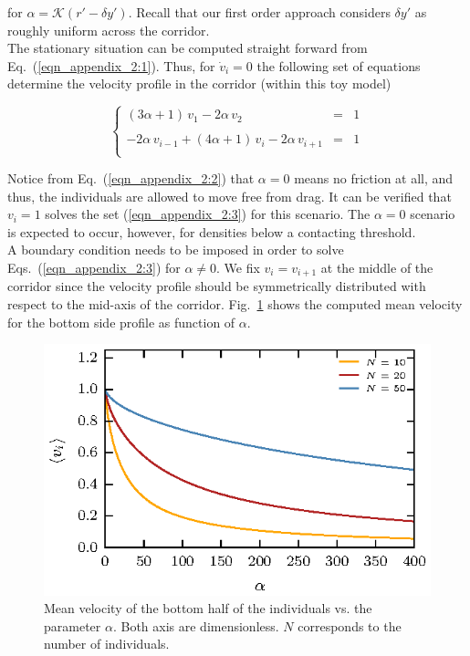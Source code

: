 \documentclass[preprint,12pt]{elsarticle}
\begin{document}
\noindent for $\alpha=\mathcal{K}(r'-\delta y')$. Recall that our first order 
approach considers $\delta y'$ as roughly uniform across the corridor. \\

The stationary situation can be computed straight forward from 
Eq.~(\ref{eqn_appendix_2:1}). Thus, for $\dot{v}_{i}=0$ the following set of 
equations determine the velocity profile in the corridor (within this toy 
model)

\begin{equation}
  \left\{\begin{array}{lcl}
          (3\alpha+1)\,v_{1} - 2\alpha\,v_{2} & = & 1 \\
          & & \\
          -2\alpha\,v_{i-1}+(4\alpha+1)\,v_i-2\alpha\,v_{i+1} & = & 1\\
         \end{array}\right.\label{eqn_appendix_2:3}
\end{equation}

Notice from  Eq.~(\ref{eqn_appendix_2:2}) that $\alpha=0$ means no friction at 
all, and thus, the individuals are allowed to move free from drag. It can be 
verified that $v_i=1$ solves the set (\ref{eqn_appendix_2:3}) for this 
scenario. The $\alpha=0$ scenario is expected to occur, however, for densities 
below a contacting threshold. \\

A boundary condition needs to be imposed in order to solve 
Eqs.~(\ref{eqn_appendix_2:3}) for $\alpha\neq 0$. We fix 
$v_i=v_{i+1}$ at the middle of the corridor since the velocity profile 
should be symmetrically distributed with respect to the mid-axis of the 
corridor. Fig.~\ref{fig:appendix_2:1} shows the computed mean velocity for the 
bottom side profile as function of $\alpha$.\\


\begin{figure}[htbp!]
\centering
\includegraphics[width=0.7\columnwidth]
{./fig_velocity_model.eps}
\caption{\label{fig:appendix_2:1} Mean velocity of the bottom half of the 
individuals vs. the parameter $\alpha$. Both axis are dimensionless. $N$ 
corresponds to the number of individuals. }
\end{figure}
\end{document}
